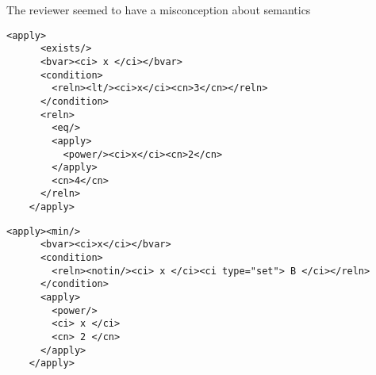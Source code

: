 \documentclass{llncs}
\begin{document}
\begin{newpart}{The reviewer seemed to have a misconception about semantics}
\begin{lstlisting}[label=ex:exists2,language=MathML2,
  caption={MathML-1 for ``there exists $x < 3$ such that $x^2=4$''}]
    <apply>
      <exists/>
      <bvar><ci> x </ci></bvar>
      <condition>
        <reln><lt/><ci>x</ci><cn>3</cn></reln>
      </condition>
      <reln>
        <eq/>
        <apply>
          <power/><ci>x</ci><cn>2</cn>
        </apply>
        <cn>4</cn>
      </reln>
    </apply>
\end{lstlisting}
\fi
\iffull

\begin{lstlisting}[label=ex:connotin,language=MathML2,
  caption={MathML-1 for ``there exists $x$ such that $x^5 < 3$''}]
    <apply><min/>
      <bvar><ci>x</ci></bvar>
      <condition>
        <reln><notin/><ci> x </ci><ci type="set"> B </ci></reln>
      </condition>
      <apply>
        <power/>
        <ci> x </ci>
        <cn> 2 </cn>
      </apply>
    </apply>
\end{lstlisting}


\end{newpart}
\end{document}
